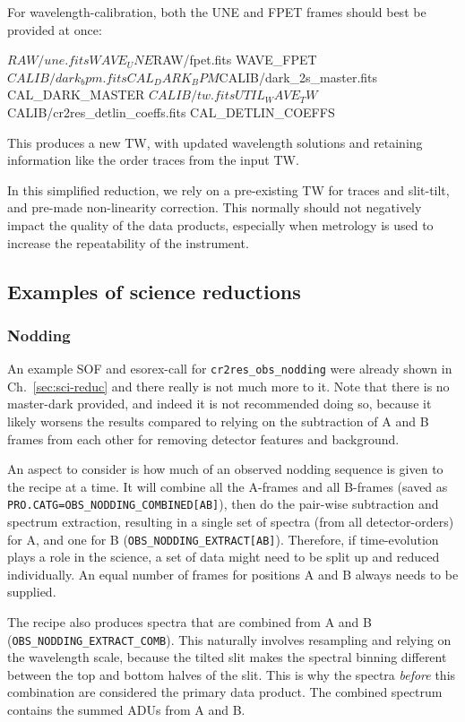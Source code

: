 For wavelength-calibration, both the UNE and FPET frames should best be provided
at once:
\begin{shell}[fontsize=\small]
$RAW/une.fits           WAVE_UNE
$RAW/fpet.fits          WAVE_FPET
$CALIB/dark_bpm.fits    CAL_DARK_BPM
$CALIB/dark_2s_master.fits CAL_DARK_MASTER
$CALIB/tw.fits          UTIL_WAVE_TW
$CALIB/cr2res_detlin_coeffs.fits  CAL_DETLIN_COEFFS

\end{shell}
This produces a new TW, with updated wavelength solutions and retaining information like the order traces from the input TW.

In this simplified reduction, we rely on a pre-existing TW for traces and slit-tilt, and pre-made non-linearity correction. This normally should not negatively impact the quality of the data products, especially when metrology is used to increase the repeatability of the instrument.

\subsection{Examples of science reductions}

\subsubsection{Nodding}
\label{sec:nodding}
An example SOF and esorex-call for \verb!cr2res_obs_nodding! were already shown
in Ch.~\ref{sec:sci-reduc} and there really is not much more to it. Note that
there is no master-dark provided, and indeed it is not recommended doing so,
because it likely worsens the results compared to relying on the subtraction of
A and B frames from each other for removing detector features and background.

An aspect to consider is how much of an observed nodding sequence is given to
the recipe at a time. It will combine all the A-frames and all B-frames (saved
as \verb!PRO.CATG=OBS_NODDING_COMBINED[AB]!), then do the pair-wise subtraction
and spectrum extraction, resulting in a single set of spectra (from all
detector-orders) for A, and one for B (\verb!OBS_NODDING_EXTRACT[AB]!).
Therefore, if time-evolution plays a role in the science, a set of data might
need to be split up and reduced individually. An equal number of frames for
positions A and B always needs to be supplied.

The recipe also produces spectra that are combined from A and B
(\verb!OBS_NODDING_EXTRACT_COMB!). This naturally involves resampling and
relying on the wavelength scale, because the tilted slit makes the spectral
binning different between the top and bottom halves of the slit. This is why the
spectra \emph{before} this combination are considered the primary data product.
The combined spectrum contains the summed ADUs from A and B.

